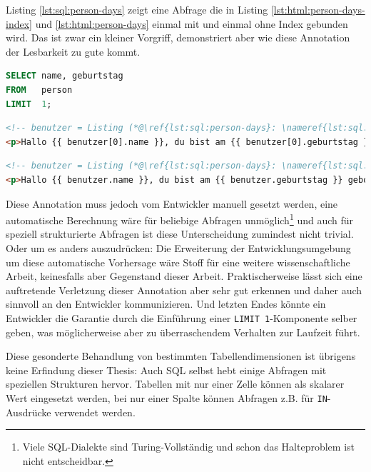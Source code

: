 Listing \ref{lst:sql:person-days} zeigt eine Abfrage die in Listing \ref{lst:html:person-days-index} und \ref{lst:html:person-days} einmal mit und einmal ohne Index gebunden wird. Das ist zwar ein kleiner Vorgriff, demonstriert aber wie diese Annotation der Lesbarkeit zu gute kommt.

\begin{lstlisting}[language=SQL, caption=Abfrage mit garantiert einer Ergebniszeile,label=lst:sql:person-days]
SELECT name, geburtstag
FROM   person
LIMIT  1;
\end{lstlisting}

\begin{lstlisting}[language=HTML, caption=String-Interpolation mit Indexzugriff, label=lst:html:person-days-index]
<!-- benutzer = Listing (*@\ref{lst:sql:person-days}: \nameref{lst:sql:person-days}@*) -->
<p>Hallo {{ benutzer[0].name }}, du bist am {{ benutzer[0].geburtstag }} geboren.</p>
\end{lstlisting}

\begin{lstlisting}[language=HTML, caption=String-Interpolation mit implizitem Index, label=lst:html:person-days]
<!-- benutzer = Listing (*@\ref{lst:sql:person-days}: \nameref{lst:sql:person-days}@*) -->
<p>Hallo {{ benutzer.name }}, du bist am {{ benutzer.geburtstag }} geboren.</p>
\end{lstlisting}

Diese Annotation muss jedoch vom Entwickler manuell gesetzt werden, eine automatische Berechnung wäre für beliebige Abfragen unmöglich\footnote{Viele SQL-Dialekte sind Turing-Vollständig und schon das Halteproblem ist nicht entscheidbar.} und auch für speziell strukturierte Abfragen ist diese Unterscheidung zumindest nicht trivial. Oder um es anders auszudrücken: Die Erweiterung der Entwicklungsumgebung um diese automatische Vorhersage wäre Stoff für eine weitere wissenschaftliche Arbeit, keinesfalls aber Gegenstand dieser Arbeit. Praktischerweise lässt sich eine auftretende Verletzung dieser Annotation aber sehr gut erkennen und daher auch sinnvoll an den Entwickler kommunizieren. Und letzten Endes könnte ein Entwickler die Garantie durch die Einführung einer \texttt{LIMIT 1}-Komponente selber geben, was möglicherweise aber zu überraschendem Verhalten zur Laufzeit führt.

Diese gesonderte Behandlung von bestimmten Tabellendimensionen ist übrigens keine Erfindung dieser Thesis: Auch SQL selbst hebt einige Abfragen mit speziellen Strukturen hervor. Tabellen mit nur einer Zelle können als skalarer Wert eingesetzt werden, bei nur einer Spalte können Abfragen z.B. für \texttt{IN}-Ausdrücke verwendet werden.

